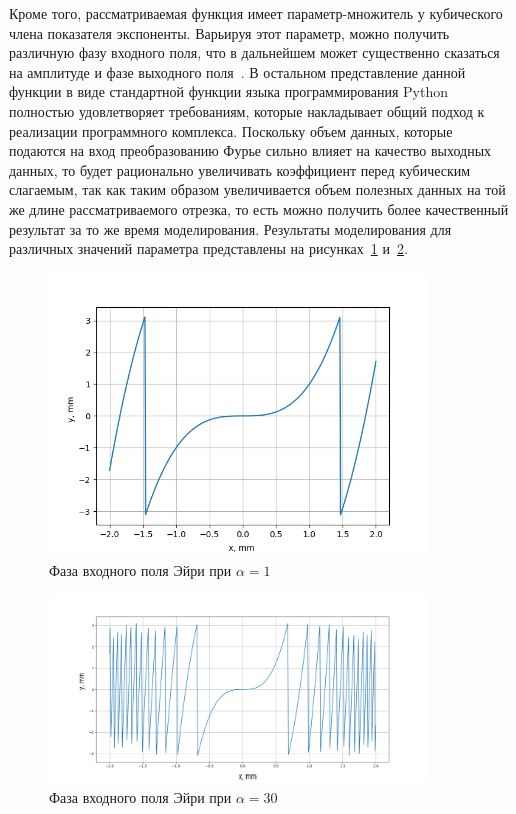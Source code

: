 {    Кроме того, рассматриваемая функция имеет параметр-множитель у
    кубического члена показателя экспоненты. Варьируя этот параметр, можно
    получить различную фазу входного поля, что в дальнейшем может
    существенно сказаться на амплитуде и фазе выходного поля~\cite{Khonina_2011}. В остальном
    представление данной функции в виде стандартной функции языка
    программирования Python полностью удовлетворяет требованиям, которые
    накладывает общий подход к реализации программного комплекса.
    Поскольку объем данных, которые подаются на вход преобразованию
    Фурье сильно влияет на качество выходных данных, то будет рационально
    увеличивать коэффициент перед кубическим слагаемым, так как таким образом
    увеличивается объем полезных данных на той же длине рассматриваемого
    отрезка, то есть можно получить более качественный результат за то же время
    моделирования. Результаты моделирования для различных значений параметра представлены на рисунках~\ref{airy_phase} и~\ref{airyphase1}.
    \begin{figure}[H]
        \begin{center}
            \includegraphics[width=10cm]{plots/airyphase}
            \caption{Фаза входного поля Эйри при $\alpha  = 1$}
            \label{airy_phase}
        \end{center}
    \end{figure}

    \begin{figure}[H]
        \begin{center}
            \includegraphics[width=10cm]{plots/airyphase1}
            \caption{  Фаза входного поля Эйри при $\alpha  = 30$}
            \label{airyphase1}
        \end{center}


\end{figure}}
